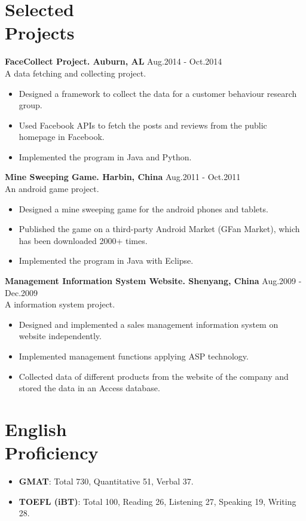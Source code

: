 \documentclass[11pt,margin,line]{res}
\newcommand{\bulletindent}{11pt}
\begin{document}
\begin{resume}
\section{Selected\\Projects}
    {\bf FaceCollect Project. Auburn, AL}	\hfill   Aug.2014 - Oct.2014 \\
    A data fetching and collecting project.
	\begin{itemize}[leftmargin=\bulletindent]
		\itemsep -2pt
			\item Designed a framework to collect the data for a customer behaviour research group.
			\item Used Facebook APIs to fetch the posts and reviews from the public homepage in Facebook.
    	\item Implemented the program in Java and Python. 
	\end{itemize}


    {\bf Mine Sweeping Game. Harbin, China}	\hfill   Aug.2011 - Oct.2011 \\
    An android game project. 
	\begin{itemize}[leftmargin=\bulletindent]
		\itemsep -2pt
			\item Designed a mine sweeping game for the android phones and tablets.
			\item Published the game on a third-party Android Market (GFan Market), which has been downloaded 2000+ times.
    	\item Implemented the program in Java with Eclipse. 
	\end{itemize}

    {\bf Management Information System Website. Shenyang, China}	\hfill   Aug.2009 - Dec.2009 \\
    A information system project.
	\begin{itemize}[leftmargin=\bulletindent]
		\itemsep -2pt
			\item Designed and implemented a sales management information system on website independently. 
			\item Implemented management functions applying ASP technology.
			\item Collected data of different products from the website of the company and stored the data in an Access database.
	\end{itemize}

\section{English\\Proficiency}
	\begin{itemize}[leftmargin=\bulletindent]
	\item {\bf GMAT}: Total 730, Quantitative 51, Verbal 37.
	\item {\bf TOEFL (iBT)}: Total 100, Reading 26, Listening 27, Speaking 19, Writing 28.
	\end{itemize}


\end{resume}
\end{document}
